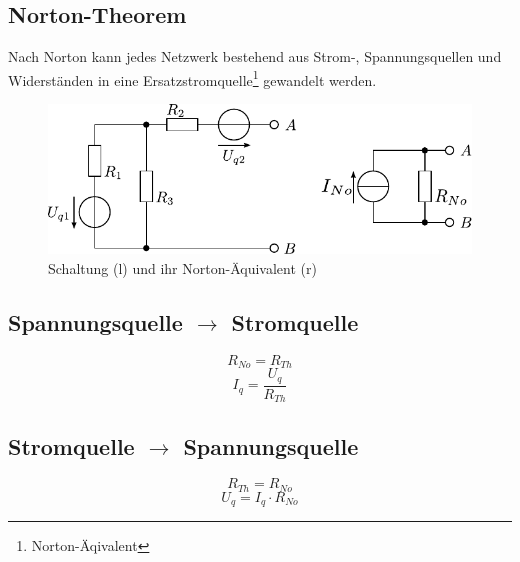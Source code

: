 \subsection{Norton-Theorem}
Nach Norton kann jedes Netzwerk bestehend aus Strom-, Spannungsquellen und Widerständen in eine Ersatzstromquelle\footnote{Norton-Äqivalent} gewandelt werden.

\begin{figure}[h!]
\centering
\includegraphics[scale=\schscale]{norton_sch_2.pdf}
\caption{Schaltung (l) und ihr Norton-Äquivalent (r)}
\label{sch:norton}
\end{figure}

\subsection{Spannungsquelle $\rightarrow$ Stromquelle}
\[ R_{No} = R_{Th} \]
\[ I_q = \frac{U_q}{R_{Th}} \]

\subsection{Stromquelle $\rightarrow$ Spannungsquelle}
\[ R_{Th} = R_{No} \]
\[ U_q = I_q \cdot R_{No} \]
